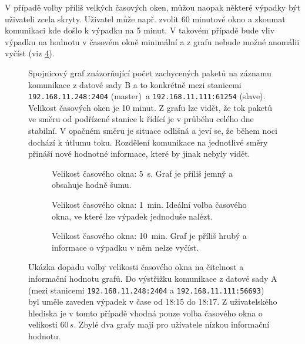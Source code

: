 V případě volby příliš velkých časových oken, můžou naopak některé výpadky být uživateli zcela skryty. Uživatel může např. zvolit 60 minutové okno a zkoumat komunikaci kde došlo k výpadku na 5 minut. V takovém případě bude vliv výpadku na hodnotu v časovém okně minimální a z grafu nebude možné anomálii vyčíst (viz \ref{sub:third}).


\begin{figure}[H]
	\centering
	\resizebox{1\textwidth}{!}
    {
        
    }
    \caption{Spojnicový graf znázorňující počet zachycených paketů na záznamu komunikace z datové sady B a to konkrétně mezi stanicemi \texttt{192.168.11.248:2404} (master)~a \texttt{192.168.11.111:61254} (slave). Velikost časových oken je 10 minut. Z grafu lze vidět, že tok paketů ve směru od podřízené stanice k řídící je v průběhu celého dne stabilní. V opačném směru je situace odlišná a jeví se, že během noci dochází k útlumu toku. Rozdělení komunikace na jednotlivé směry přináší nové hodnotné informace, které by jinak nebyly vidět.}
	\label{graph1}
\end{figure}


\begin{figure}[H]%
    \centering
    \begin{subfigure}{\textwidth}
        \centering
        \resizebox{\textwidth}{!}
        {
            
        }
        \captionsetup{width=.9\linewidth}
        \caption{Velikost časového okna: 5~s. Graf je příliš jemný a obsahuje hodně šumu.}
        \label{sub:first}
    \end{subfigure}
    
    
    \begin{subfigure}{\textwidth}
        \centering
        \resizebox{\textwidth}{!}
        {
            
        }
        \captionsetup{width=.9\linewidth}
        \caption{Velikost časového okna: 1~min. Ideální volba časového okna, ve které lze výpadek jednoduše nalézt.}
    
        \label{sub:second}
    \end{subfigure}
    
    
    \begin{subfigure}{\textwidth}
        \centering
        \resizebox{\textwidth}{!}
        {
            
        }
        \captionsetup{width=.9\linewidth}
        \caption{Velikost časového okna: 10~min. Graf je příliš hrubý a informace o výpadku v něm nelze vyčíst.}
        \label{sub:third}
    \end{subfigure}
    
    \caption{Ukázka dopadu volby velikosti časového okna na čitelnost a informační hodnotu grafů. Do výstřižku komunikace z datové sady A (mezi stanicemi \texttt{192.168.11.248:2404} a \texttt{192.168.11.111:56693}) byl uměle zaveden výpadek v čase od 18:15 do 18:17. Z uživatelského hlediska je v tomto případě vhodná pouze volba časového okna o velikosti $60\,s$. Zbylé dva grafy mají pro uživatele nízkou informační hodnotu.}%
    \label{fig:plot_var_sizes}%
\end{figure}




